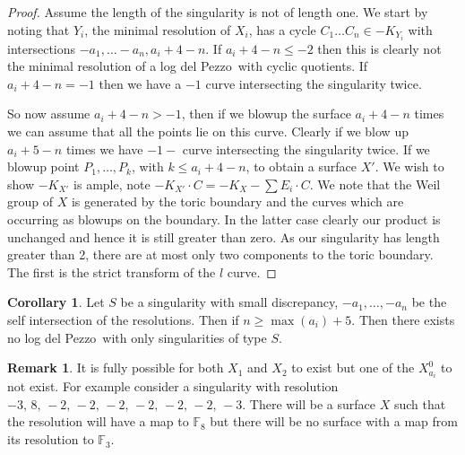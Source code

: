 \documentclass[11pt]{amsbook}
\theoremstyle{definition}
\theoremstyle{definition}
\newtheorem{cor}[thm]{Corollary}
\theoremstyle{definition}
\theoremstyle{definition}
\theoremstyle{definition}
\theoremstyle{definition}
\theoremstyle{definition}
\theoremstyle{definition}
\newtheorem*{rem}{Remark}
\newcommand{\ldp}{log del Pezzo}
\newcommand{\mb}[1]{\mathbb{#1}}
\begin{document}
\begin{proof}
Assume the length of the singularity is not of length one. We start by noting that $Y_i$, the minimal resolution of $X_i$, has a cycle $C_1 \dots C_n \in -K_{Y_i}$ with intersections $-a_1, \dots -a_n, a_i+4-n$. If $a_i+4 -n \leq -2$ then this is clearly not the minimal resolution of a \ldp\ with cyclic quotients. If $a_i+4-n = -1$ then we have a $-1$ curve intersecting the singularity twice. 



So now assume $a_i + 4-n > -1$, then if we blowup the surface $a_i + 4 -n $ times we can assume that all the points lie on this curve. Clearly if we blow up $a_i + 5 - n$ times we have $-1-$ curve intersecting the singularity twice. If we blowup point $P_1, \dots, P_k$, with $k \leq a_i + 4 - n$, to obtain a surface $X'$. We wish to show $-K_{X'}$ is ample, note $-K_{X'}\cdot C = -K_{X} - \sum{E_i} \cdot C$. We note that the Weil group of $X$ is generated by the toric boundary and the curves which are occurring as blowups on the boundary. In the latter case clearly our product is unchanged and hence it is still greater than zero. As our singularity has length greater than 2, there are at most only two components to the toric boundary. The first is the strict transform of the $l$ curve. 
\end{proof}
\begin{cor}
Let $S$ be a singularity with small discrepancy, $-a_1, \dots , -a_n$ be the self intersection of the resolutions. Then if $n \geq \max (a_i) + 5 $. Then there exists no \ldp\ with only singularities of type $S$.
\end{cor}
\begin{rem}
It is fully possible for both $X_1$ and $X_2$ to exist but one of the $X_{a_i}^0$ to not exist. For example consider a singularity with resolution $-3, \, 8, \, -2, \, -2, \, -2, \, -2, \, -2, \, -2, \, -3$. There will be a surface $X$ such that the resolution will have a map to $\mb{F}_8$ but there will be no surface with a map from its resolution to $\mb{F}_3$.
\end{rem}
\end{document}
